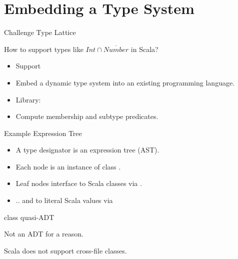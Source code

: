 \section{Embedding a Type System}

{  
\begin{frame}{Challenge }{Type Lattice}

  How to support types like $Int\cap\overline{Number}$ in Scala?

  \begin{itemize}
  \item   Support 
  \item Embed a dynamic type system into an existing programming language.
  \item Library: 
  \item Compute membership and subtype predicates.
  \end{itemize}

\end{frame}
}



\newsavebox\tdast
\begin{lrbox}{\tdast}
  \begin{minipage}{11cm}
    
  \end{minipage}
\end{lrbox}


\begin{frame}{Example  Expression Tree}
  \usebox\tdast

  \medskip

  \centering

  \scalebox{0.7}{}
  \begin{itemize}
  \item A type designator is an expression tree (AST).
  \item Each node is an instance of class .
  \item Leaf nodes interface to Scala classes via .
  \item .. and to literal Scala values via 
  \end{itemize}
\end{frame}


\begin{frame}{ class quasi-ADT}
  \scalebox{0.9}{}

  \medskip

  Not an ADT for a  reason.

  Scala does not support cross-file  classes.
\end{frame}


